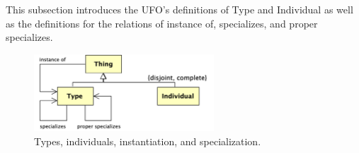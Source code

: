 \documentclass{article}
\newcommand{\me}[1]{\textsf{#1}}
\begin{document}
This subsection introduces the UFO's definitions of \me{Type} and \me{Individual} as well as the definitions for the relations of \me{instance of}, \me{specializes}, and \me{proper specializes}.

\begin{figure}[ht]
    \centering
    \includegraphics[width=0.6\textwidth]{diagrams/Instantiation_Diagram.png}
    \caption{Types, individuals, instantiation, and specialization.}
    \label{fig:06_instantiation}
\end{figure}
\end{document}
